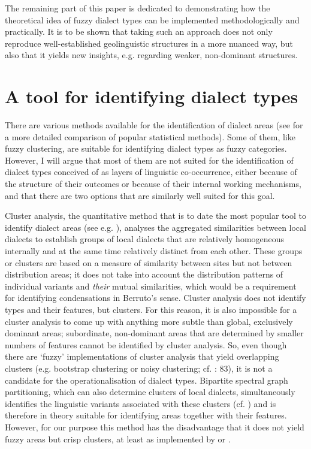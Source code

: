 \documentclass[output=paper]{LSP/langsci}
\begin{document}
The remaining part of this paper is dedicated to demonstrating how the theoretical idea of fuzzy dialect types can be implemented methodologically and practically. It is to be shown that taking such an approach does not only reproduce well-established geolinguistic structures in a more nuanced way, but also that it yields new insights, e.g. regarding weaker, non-dominant structures.

\section{A tool for identifying dialect types}
There are various methods available for the identification of dialect areas (see \citealt{grieve_comparison_2014} for a more detailed comparison of popular statistical methods). Some of them, like fuzzy clustering, are suitable for identifying dialect types as fuzzy categories. However, I will argue that most of them are not suited for the identification of dialect types conceived of as layers of linguistic co-occurrence, either because of the structure of their outcomes or because of their internal working mechanisms, and that there are two options that are similarly well suited for this goal.

Cluster analysis, the quantitative method that is to date the most popular tool to identify dialect areas (see e.g. \citealt[17--29]{goebl_stammbaum_1983,prokic_recognizing_2008,prokic_families_2010}), analyses the aggregated similarities between local dialects to establish groups of local dialects that are relatively homogeneous internally and at the same time relatively distinct from each other. These groups or clusters are based on a measure of similarity between sites but not between distribution areas; it does not take into account the distribution patterns of individual variants and \textit{their} mutual similarities, which would be a requirement for identifying condensations in Berruto’s sense. Cluster analysis does not identify types and their features, but clusters. For this reason, it is also impossible for a cluster analysis to come up with anything more subtle than global, exclusively dominant areas; subordinate, non-dominant areas that are determined by smaller numbers of features cannot be identified by cluster analysis. So, even though there are ‘fuzzy’ implementations of cluster analysis that yield overlapping clusters (e.g. bootstrap clustering or noisy clustering; cf. \citealt{nerbonne_gabmap_2011}: 83), it is not a candidate for the operationalisation of dialect types. Bipartite spectral graph partitioning, which can also determine clusters of local dialects, simultaneously identifies the linguistic variants associated with these clusters (cf. \citealt{wieling_bipartite_2011}) and is therefore in theory suitable for identifying areas together with their features. However, for our purpose this method has the disadvantage that it does not yield fuzzy areas but crisp clusters, at least as implemented by \citet{wieling_bipartite_2011} or \citet{wieling_analyzing_2013}. 
\end{document}
